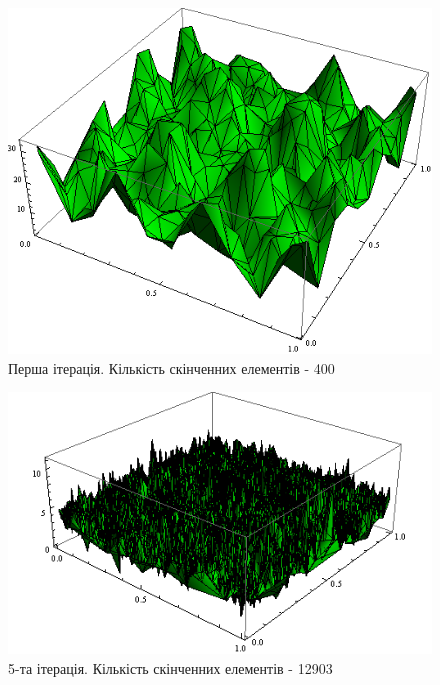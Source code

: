 \begin{figure}[H]
	\centering
    \includegraphics[scale=0.8]{problem1/MY/AEE/1}
    \caption{Перша ітерація. Кількість скінченних елементів - 400}
    \label{fig:p1_aee1}
\end{figure}

\begin{figure}[H]
	\centering
    \includegraphics[scale=0.85]{problem1/MY/AEE/5}
    \caption{5-та ітерація. Кількість скінченних елементів - 12903}
    \label{fig:p1_aee5}
\end{figure}

